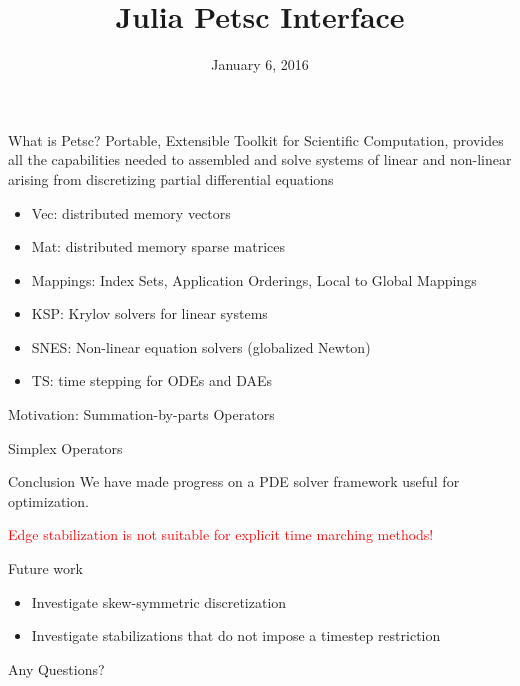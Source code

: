 \documentclass{beamer}
\title{Julia Petsc Interface}
\date{January 6, 2016}
\begin{document}
\begin{frame}
\titlepage
\end{frame}

\begin{frame}{What is Petsc?}
Portable, Extensible Toolkit for Scientific Computation, provides all the 
capabilities needed to assembled and solve systems of linear and non-linear 
arising from discretizing partial differential equations
\begin{itemize}
  \item Vec: distributed memory vectors
  \item Mat: distributed memory sparse matrices
  \item Mappings: Index Sets, Application Orderings, Local to Global Mappings
  \item KSP: Krylov solvers for linear systems
  \item SNES: Non-linear equation solvers (globalized Newton)
  \item TS: time stepping for ODEs and DAEs
\end{itemize}
\end{frame}


\begin{frame}{Motivation: Summation-by-parts Operators}

\end{frame}


\begin{frame}{Simplex Operators}

\end{frame}



\begin{frame}{Conclusion}
We have made progress on a PDE solver framework useful for optimization.

\hfill \break
\textcolor{red}{Edge stabilization is not suitable for explicit time marching methods!}

\hfill \break
Future work
\begin{itemize}
  \item Investigate skew-symmetric discretization
  \item Investigate stabilizations that do not impose a timestep restriction
\end{itemize}
\end{frame}




\begin{frame}
\begin{center}  
Any Questions?
\end{center}

\end{frame}
\end{document}
